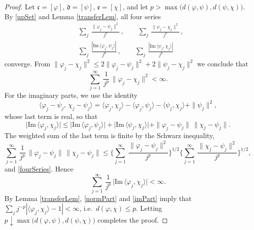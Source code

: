 \documentclass[twoside,11pt,letter]{article}
\def\fc{{\mathfrak{c}}}
\def\fd{{\mathfrak{d}}}
\def\fe{{\mathfrak{e}}}
\def\im{\mathrm{Im}}
\theoremstyle{definition}
\theoremstyle{definition}
\theoremstyle{plain}
\begin{document}
\begin{proof}
Let $\fc=[\varphi]$, $\fd=[\psi]$, $\fe=[\chi]$, and let $p>\max\big(d(\varphi,\psi),d(\psi,\chi)\big)$. By \eqref{upSet} and Lemma \ref{transferLem}, all four series
\begin{equation}\label{fourSeries}
\begin{split}
&\sum_j\,\frac{\|\varphi_j-\psi_j\|^2}{j^p}\,,\qquad
\sum_j\,\frac{\|\psi_j-\chi_j\|^2}{j^p}\,,\\
&\sum_j\,\frac{|\im\,\langle\varphi_j,\psi_j\rangle|}{j^p}\,,\qquad
\sum_j\,\frac{|\im\,\langle\psi_j,\chi_j\rangle|}{j^p}
\end{split}
\end{equation}
converge. From $\|\varphi_j-\chi_j\|^2\leq 2\|\varphi_j-\psi_j\|^2+2\|\psi_j-\chi_j\|^2$ we conclude that
\begin{equation}\label{normPart}
\sum_{j=1}^\infty\,\frac{1}{j^p}\,\|\varphi_j-\chi_j\|^2<\infty.
\end{equation}
For the imaginary parts, we use the identity
\begin{equation*}
\langle\varphi_j-\psi_j,\,\chi_j-\psi_j\rangle=\langle\varphi_j,\chi_j\rangle-\langle\varphi_j,\psi_j\rangle-\langle\psi_j,\chi_j\rangle+\|\psi_j\|^2,
\end{equation*}
whose last term is real, so that
\begin{equation*}
\big|\im\,\langle\varphi_j,\chi_j\rangle\big|\leq\big|\im\,\langle\varphi_j,\psi_j\rangle\big|+\big|\im\,\langle\psi_j,\chi_j\rangle\big|
+\|\varphi_j-\psi_j\|\,\|\chi_j-\psi_j\|.
\end{equation*}
The weighted sum of the last term is finite by the Schwarz inequality,
\begin{equation*}
\sum_{j=1}^\infty\,\frac{1}{j^p}\,\|\varphi_j-\psi_j\|\,\|\chi_j-\psi_j\|
\leq\Big\{\sum_{j=1}^\infty\,\frac{\|\varphi_j-\psi_j\|^2}{j^{p}}\Big\}^{1/2}
\Big\{\sum_{j=1}^\infty\,\frac{\|\chi_j-\psi_j\|^2}{j^{p}}\Big\}^{1/2},
\end{equation*}
and \eqref{fourSeries}. Hence
\begin{equation}\label{imPart}
\sum_{j=1}^\infty\,\frac{1}{j^p}\,\big|\im\,\langle\varphi_j,\chi_j\rangle\big|<\infty.
\end{equation}
By Lemma \ref{transferLem}, \eqref{normPart} and \eqref{imPart} imply that $\sum_j j^{-p}|\langle\varphi_j,\chi_j\rangle-1|<\infty$, i.e.\ $d(\varphi,\chi)\leq p$. Letting $p\downarrow\max\big(d(\varphi,\psi),d(\psi,\chi)\big)$ completes the proof.
\end{proof}
\end{document}
